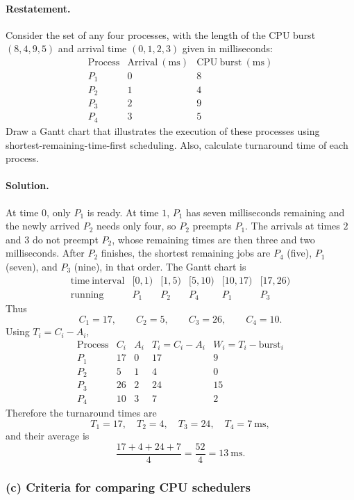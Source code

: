 \paragraph{Restatement.}
Consider the set of any four processes, with the length of the CPU
burst \((8,4,9,5)\) and arrival time \((0,1,2,3)\) given in
milliseconds:
\[
\begin{array}{c|c|c}
\mathrm{Process}&\mathrm{Arrival\ (ms)}&\mathrm{CPU\ burst\ (ms)}\\ \hline
P_1&0&8\\
P_2&1&4\\
P_3&2&9\\
P_4&3&5
\end{array}
\]
Draw a Gantt chart that illustrates the execution of these processes
using shortest-remaining-time-first scheduling.  Also, calculate
turnaround time of each process.

\paragraph{Solution.}
At time \(0\), only \(P_1\) is ready.  At time \(1\), \(P_1\) has
seven milliseconds remaining and the newly arrived \(P_2\) needs only
four, so \(P_2\) preempts \(P_1\).  The arrivals at times \(2\) and
\(3\) do not preempt \(P_2\), whose remaining times are then three and
two milliseconds.  After \(P_2\) finishes, the shortest remaining jobs
are \(P_4\) (five), \(P_1\) (seven), and \(P_3\) (nine), in that order.
The Gantt chart is
\[
\begin{array}{c|ccccc}
\mathrm{time\ interval}&[0,1)&[1,5)&[5,10)&[10,17)&[17,26)\\ \hline
\mathrm{running}&P_1&P_2&P_4&P_1&P_3
\end{array}
\]
Thus
\[
C_1=17,\qquad C_2=5,\qquad C_3=26,\qquad C_4=10.
\]
Using \(T_i=C_i-A_i\),
\[
\begin{array}{c|c|c|c|c}
\mathrm{Process}&C_i&A_i&T_i=C_i-A_i&
W_i=T_i-\mathrm{burst}_i\\ \hline
P_1&17&0&17&9\\
P_2&5&1&4&0\\
P_3&26&2&24&15\\
P_4&10&3&7&2
\end{array}
\]
Therefore the turnaround times are
\[
\boxed{T_1=17,\quad T_2=4,\quad T_3=24,\quad T_4=7\ \mathrm{ms}},
\]
and their average is
\[
\frac{17+4+24+7}{4}=\frac{52}{4}=13\ \mathrm{ms}.
\]

\subsubsection*{(c) Criteria for comparing CPU schedulers}

